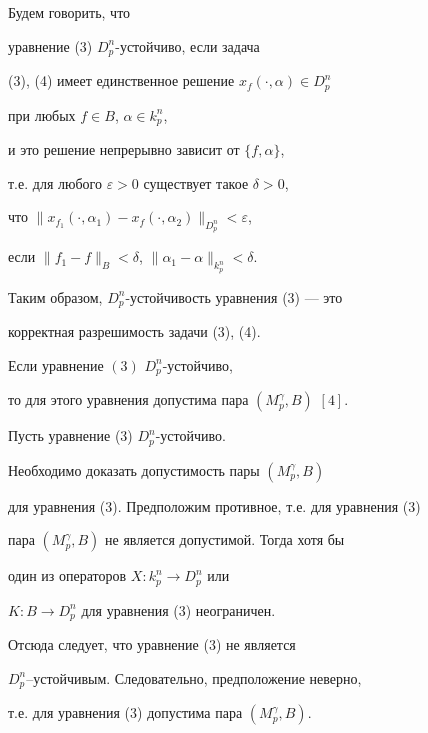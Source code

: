 \begin{defn}


Будем говорить, что


уравнение (3) $D_p^n$-устойчиво, если задача


(3), (4) имеет единственное решение $x_f(\cdot,\alpha)\in D_p^n$


при любых $f \in B$, $\alpha \in k_p^n$,


и это решение непрерывно зависит от $\{f,\alpha \}$,


т.е. для любого $\varepsilon > 0$ существует такое $\delta > 0$,


что $\|x_{f_1}(\cdot,\alpha _1)


- x_f(\cdot,\alpha _2)\|_{D_p^n} < \varepsilon$,


если $\|f_1 - f\|_B < \delta$, $\|\alpha_1-\alpha\|_{k_p^n}<\delta$.


\end{defn}





Таким образом, $D_p^n$-устойчивость уравнения (3) --- это


корректная разрешимость задачи (3), (4).





\begin{lem}


Если уравнение $(3)$ $D_p^n$-устойчиво,


то для этого уравнения допустима пара $(M_p^\gamma ,B)$ $[4]$.


\end{lem}





\begin{pf}


Пусть уравнение (3) $D_p^n$-устойчиво.


Необходимо доказать допустимость пары $(M_p^\gamma ,B)$


для уравнения (3). Предположим противное, т.е. для уравнения (3)


пара $(M_p^\gamma ,B)$ не является допустимой. Тогда хотя бы


один из операторов $X:k_p^n \to D_p^n$ или


$K:B \to D_p^n$ для уравнения (3) неограничен.


Отсюда следует, что уравнение (3) не является


$D_p^n$--устойчивым. Следовательно, предположение неверно,


т.е. для уравнения (3) допустима пара $(M_p^\gamma ,B)$.


\end{pf}





